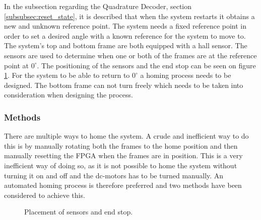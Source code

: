 \documentclass[../../../main]{subfiles}
\begin{document}
In the subsection regarding the Quadrature Decoder, section \ref{subsubsec:reset_state}, it is described that when the system restarts it obtains a new and unknown reference point.
The system needs a fixed reference point in order to set a desired angle with a known reference for the system to move to. \\
The system's top and bottom frame are both equipped with a hall sensor.
The sensors are used to determine when one or both of the frames are at the reference point at $0^\circ$. The positioning of the sensors and the end stop can be seen on figure \ref{fig:homing_system}.
For the system to be able to return to $0^\circ$ a homing process needs to be designed.
The bottom frame can not turn freely which needs to be taken into consideration when designing the process.
\subsubsection{Methods}
There are multiple ways to home the system. A crude and inefficient way to do this is by manually rotating both the frames to the home position and then manually resetting the FPGA when the frames are in position.
This is a very inefficient way of doing so, as it is not possible to home the system without turning it on and off and the dc-motors has to be turned manually. 
An automated homing process is therefore preferred and two methods have been considered to achieve this.

\begin{figure}[H]
  \centering
  \def\svgwidth{\textwidth}
  
  \caption{Placement of sensors and end stop.}
  \label{fig:homing_system}
\end{figure}
\end{document}
